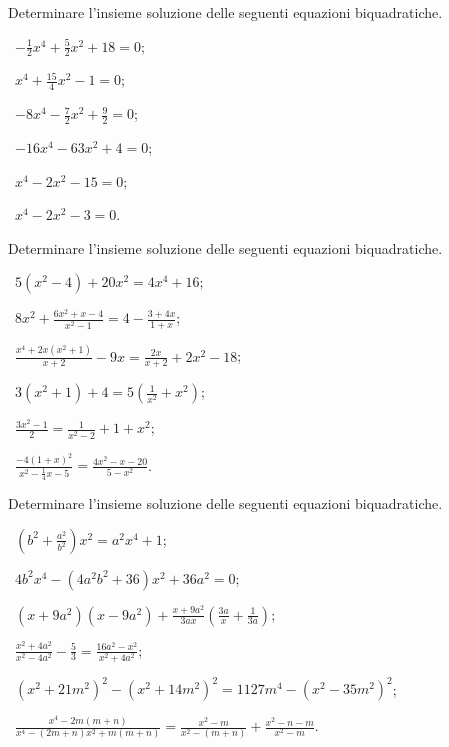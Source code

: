 \begin{esercizio}[\Ast]
\label{ese:5.21}
Determinare l'insieme soluzione delle seguenti equazioni biquadratiche.
\begin{multicols}{3}
 \begin{enumeratea}
 \item~$-\frac 1 2x^4+\frac 5 2x^2+18=0$;
 \item~$x^4+\frac{15} 4x^2-1=0$;
 \item~$-8x^4-\frac 7 2x^2+\frac 9 2=0$;
 \item~$-16x^4-63x^2+4=0$;
 \item~$x^4-2x^2-15=0$;
 \item~$x^4-2x^2-3=0$.
 \end{enumeratea}
\end{multicols}
\end{esercizio}
\pagebreak

\begin{esercizio}[\Ast]
\label{ese:5.22}
Determinare l'insieme soluzione delle seguenti equazioni biquadratiche.
\begin{multicols}{2}
 \begin{enumeratea}
 \item~$5\left(x^{2}-4\right)+20x^{2}=4x^{4}+16$;
 \item~$8x^2+\frac{6x^2+x-4}{x^2-1}=4-\frac{3+4x}{1+x}$;
 \item~$\frac{x^{4}+2x\left(x^{2}+1\right)}{x+2}-9x=\frac{2x}{x+2}+2x^{2}-18$;
 \item~$3\left(x^{2}+1\right)+4=5\left(\frac{1}{x^{2}}+x^{2}\right)$;
 \item~$\frac{3x^{2}-1}{2}=\frac{1}{x^{2}-2}+1+x^{2}$;
 \item~$\frac{-4(1+x)^{2}}{x^{2}-\frac{1}{4}x-5}=\frac{4x^{2}-x-20}{5-x^{2}}$.
 \end{enumeratea}
\end{multicols}
\end{esercizio}

\begin{esercizio}[\Ast]
\label{ese:5.23}
Determinare l'insieme soluzione delle seguenti equazioni biquadratiche.
 \begin{enumeratea}
 \item~$\left(b^{2}+\frac{a^{2}}{b^{2}}\right)x^{2}=a^{2}x^{4}+1$;
 \item~$4b^{2}x^{4}-\left(4a^{2}b^{2}+36\right)x^{2}+36a^{2}=0$;
 \item~$\left(x+9a^{2}\right)\left(x-9a^{2}\right)+\frac{x+9a^{2}}{3ax}\left(\frac{3a}{x}+\frac{1}{3a}\right)$;
 \item~$\frac{x^{2}+4a^{2}}{x^{2}-4a^{2}}-\frac{5}{3}=\frac{16a^{2}-x^{2}}{x^{2}+4a^{2}}$;
 \item~$\left(x^{2}+21m^{2}\right)^{2}-\left(x^{2}+14m^{2}\right)^{2}=1127m^{4}-\left(x^{2}-35m^{2}\right)^{2}$;
 \item~$\frac{x^{4}-2m(m+n)}{x^{4}-(2m+n)x^{2}+m(m+n)}=\frac{x^{2}-m}{x^{2}-(m+n)}+\frac{x^{2}-n-m}{x^{2}-m}$.
 \end{enumeratea}
\end{esercizio}

